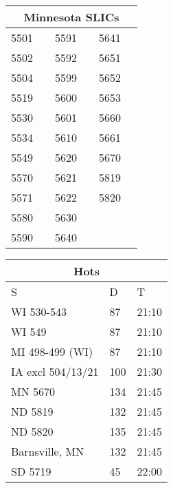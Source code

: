 \documentclass[twocolumn]{article}
\begin{document}
\large{}
\begin{tabular}[t]{llllll}
\multicolumn{6}{c}{\textbf{Minnesota SLICs}}                                          \\ 
\toprule
5501 & \cellcolor{yellow} & 5591 & \cellcolor{yellow} & 5641 & \cellcolor{blue}  \\
5502 & \cellcolor{purple} & 5592 & \cellcolor{yellow} & 5651 & \cellcolor{blue}  \\
5504 & \cellcolor{yellow} & 5599 & \cellcolor{grey}   & 5652 & \cellcolor{green} \\
5519 & \cellcolor{grey}   & 5600 & \cellcolor{blue}   & 5653 & \cellcolor{blue}  \\
5530 & \cellcolor{purple} & 5601 & \cellcolor{blue}   & 5660 & \cellcolor{green} \\
5534 & \cellcolor{purple} & 5610 & \cellcolor{blue}   & 5661 & \cellcolor{green} \\
5549 & \cellcolor{red}    & 5620 & \cellcolor{blue}   & 5670 & \cellcolor{blue}  \\
5570 & \cellcolor{green}  & 5621 & \cellcolor{blue}   & 5819 & \cellcolor{blue}  \\
5571 & \cellcolor{green}  & 5622 & \cellcolor{blue}   & 5820 & \cellcolor{blue}  \\
5580 & \cellcolor{green}  & 5630 & \cellcolor{blue}   &      &                   \\
5590 & \cellcolor{yellow} & 5640 & \cellcolor{blue}   &      &                  
\end{tabular}
\hspace{1em}
\begin{tabular}[t]{@{}lll@{}}
\multicolumn{3}{c}{\textbf{Hots}}                                          \\ 
\toprule
S                 & D   & T     \\ \midrule
WI 530-543        & 87  & 21:10 \\
WI 549            & 87  & 21:10 \\
MI 498-499 (WI)   & 87  & 21:10 \\
IA excl 504/13/21 & 100 & 21:30 \\
MN 5670           & 134 & 21:45 \\
ND 5819           & 132 & 21:45 \\
ND 5820           & 135 & 21:45 \\
Barnsville, MN    & 132 & 21:45 \\
SD 5719           & 45  & 22:00 \\ \bottomrule
\end{tabular}
\vspace{2ex}
\end{document}
